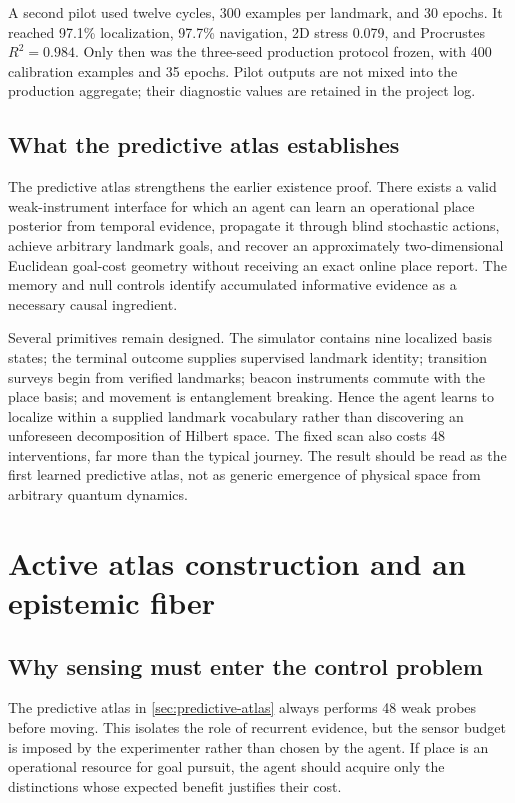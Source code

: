 \documentclass[11pt]{article}
\begin{document}
A second pilot used twelve cycles, 300 examples per landmark, and 30 epochs. It
reached 97.1\% localization, 97.7\% navigation, 2D stress 0.079, and Procrustes
$R^2=0.984$. Only then was the three-seed production protocol frozen, with 400
calibration examples and 35 epochs. Pilot outputs are not mixed into the
production aggregate; their diagnostic values are retained in the project
log.

\subsection{What the predictive atlas establishes}

The predictive atlas strengthens the earlier existence proof. There exists a
valid weak-instrument interface for which an agent can learn an operational
place posterior from temporal evidence, propagate it through blind stochastic
actions, achieve arbitrary landmark goals, and recover an approximately
two-dimensional Euclidean goal-cost geometry without receiving an exact online
place report. The memory and null controls identify accumulated informative
evidence as a necessary causal ingredient.

Several primitives remain designed. The simulator contains nine localized
basis states; the terminal outcome supplies supervised landmark identity;
transition surveys begin from verified landmarks; beacon instruments commute
with the place basis; and movement is entanglement breaking. Hence the agent
learns to localize within a supplied landmark vocabulary rather than
discovering an unforeseen decomposition of Hilbert space. The fixed scan also
costs 48 interventions, far more than the typical journey. The result should be
read as the first learned predictive atlas, not as generic emergence of
physical space from arbitrary quantum dynamics.

\section{Active atlas construction and an epistemic fiber}
\label{sec:active-atlas}

\subsection{Why sensing must enter the control problem}

The predictive atlas in \cref{sec:predictive-atlas} always performs 48 weak
probes before moving. This isolates the role of recurrent evidence, but the
sensor budget is imposed by the experimenter rather than chosen by the agent.
If place is an operational resource for goal pursuit, the agent should acquire
only the distinctions whose expected benefit justifies their cost.
\end{document}
